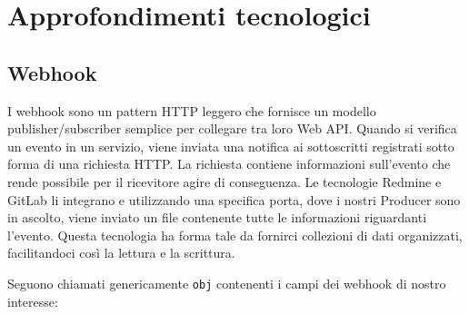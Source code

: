 \newpage
\section{Approfondimenti tecnologici}\label{ApprofondimentiTecnologici}
	
	\subsection{Webhook}
    I webhook sono un pattern HTTP leggero che fornisce un modello publisher/subscriber semplice
    per collegare tra loro Web API.	
    Quando si verifica un evento in un servizio, viene inviata una
    notifica ai sottoscritti registrati sotto forma di una richiesta HTTP. La richiesta contiene informazioni sull'evento che rende possibile per il ricevitore agire di conseguenza.
    Le tecnologie Redmine e GitLab li integrano e utilizzando una specifica porta, dove i nostri
    Producer sono in ascolto, viene inviato un file  contenente tutte le informazioni riguardanti l'evento.
    Questa tecnologia ha forma tale da fornirci collezioni di dati organizzati, facilitandoci così la lettura e la scrittura.\par
    Seguono  chiamati genericamente \texttt{obj} contenenti i campi dei webhook di nostro interesse:
